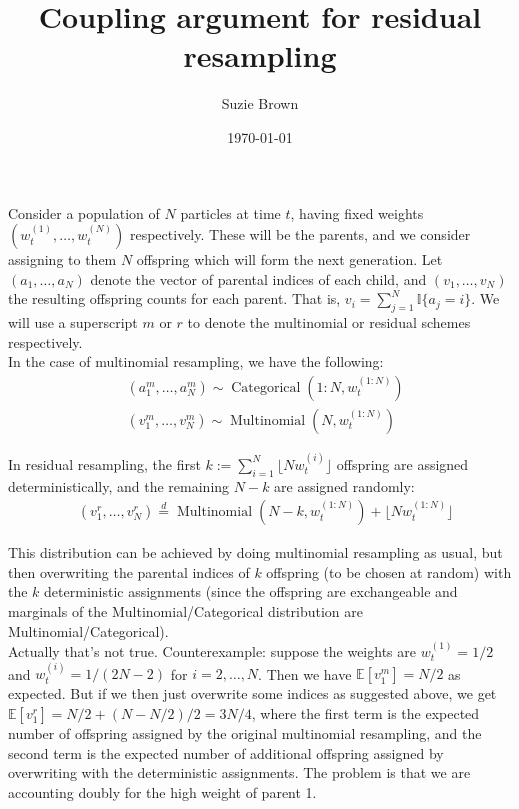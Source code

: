 \documentclass[fleqn]{article}
\title{Coupling argument for residual resampling}
\author{Suzie Brown}
\date{\today}
\newcommand{\E}{\mathbb{E}}
\newcommand{\eqdist}{\overset{d}{=}}
\newcommand{\I}[1]{\mathbb{I}\{#1\}}
\newcommand{\Mn}{\operatorname{Multinomial}}
\newcommand{\Cat}{\operatorname{Categorical}}
\newcommand{\wt}[2][t]{w_{#1}^{(#2)}}
\begin{document}
\maketitle
\thispagestyle{fancy}

Consider a population of $N$ particles at time $t$, having fixed weights $(\wt{1},\dots, \wt{N})$ respectively. These will be the parents, and we consider assigning to them $N$ offspring which will form the next generation. 
Let $(a_1, \dots, a_N)$ denote the vector of parental indices of each child, and $(v_1, \dots, v_N)$ the resulting offspring counts for each parent. That is, $v_i = \sum_{j=1}^N \I{a_j = i} $. We will use a superscript $m$ or $r$ to denote the multinomial or residual schemes respectively.\\

In the case of multinomial resampling, we have the following:
\begin{align*}
& (a_1^m, \dots, a_N^m) \sim \Cat(1:N, \wt{1:N}) \\
& (v_1^m, \dots, v_N^m) \sim \Mn(N, \wt{1:N})
\end{align*}

In residual resampling, the first $k := \sum_{i=1}^N \lfloor N\wt{i} \rfloor$ offspring are assigned deterministically, and the remaining $N-k$ are assigned randomly:
\begin{align*}
& (v_1^r, \dots, v_N^r) \eqdist \Mn(N-k, \wt{1:N}) + \lfloor N \wt{1:N} \rfloor
\end{align*}

This distribution can be achieved by doing multinomial resampling as usual, but then overwriting the parental indices of $k$ offspring (to be chosen at random) with the $k$ deterministic assignments (since the offspring are exchangeable and marginals of the Multinomial/Categorical distribution are Multinomial/Categorical).\\

\color{red}
Actually that's not true. Counterexample: suppose the weights are $\wt{1} = 1/2$ and $\wt{i} = 1/(2N-2)$ for $i=2,\dots,N$. Then we have $\E[v_1^m] = N/2$ as expected. But if we then just overwrite some indices as suggested above, we get $\E[v_1^r] = N/2 + (N-N/2)/2 = 3N/4$, where the first term is the expected number of offspring assigned by the original multinomial resampling, and the second term is the expected number of additional offspring assigned by overwriting with the deterministic assignments. The problem is that we are accounting doubly for the high weight of parent 1.
\end{document}
